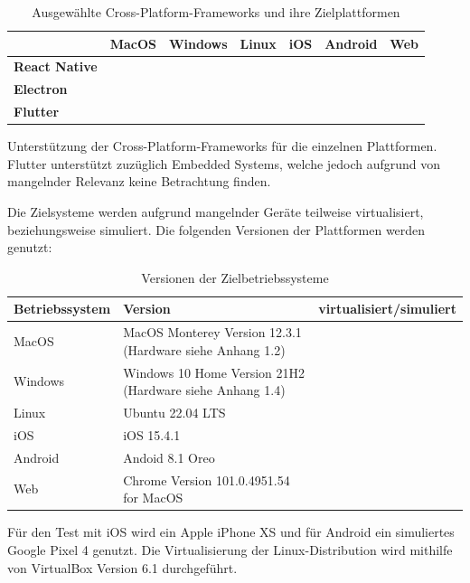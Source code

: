 \documentclass[a4paper]{scrartcl}
\newcommand{\xmark}{\ding{55}}
\begin{document}
\begin{table}[H]
 	\centering
 	\caption{Ausgewählte Cross-Platform-Frameworks und ihre Zielplattformen}
 	\begin{center}
 		\begin{tabular}{| l || c | c | c | c | c | c |}
 			\hline
 			\textbf{} & \textbf{MacOS} & \textbf{Windows} & \textbf{Linux} & \textbf{iOS} & \textbf{Android} & \textbf{Web} \\
 			\hline \hline
			\textbf{React Native} & \xmark & \xmark & \xmark & \Checkmark & \Checkmark & \xmark \\
 			\hline
 			\textbf{Electron} & \Checkmark & \Checkmark & \Checkmark & \xmark & \xmark & \xmark \\
 			\hline
 			\textbf{Flutter} & \Checkmark & \Checkmark & \Checkmark & \Checkmark & \Checkmark & \Checkmark \\
 			\hline
 		\end{tabular}
 	\end{center}
	Unterstützung der Cross-Platform-Frameworks für die einzelnen Plattformen. Flutter unterstützt zuzüglich Embedded Systems, welche jedoch aufgrund von mangelnder Relevanz keine Betrachtung finden.
 \end{table}
 
 Die Zielsysteme werden aufgrund mangelnder Geräte teilweise virtualisiert, beziehungsweise simuliert. Die folgenden Versionen der Plattformen werden genutzt:
 
\begin{table}[H]
 	\centering
 	\caption{Versionen der Zielbetriebssysteme}
 	\begin{center}
 		\begin{tabularx}{\linewidth}{| Y | Y | c |}
 			\hline
 			\textbf{Betriebssystem} & \textbf{Version} & \textbf{virtualisiert/simuliert} \\
 			\hline \hline
			MacOS & MacOS Monterey Version 12.3.1 (Hardware siehe Anhang 1.2) & \xmark \\
 			\hline
 			Windows & Windows 10 Home Version 21H2 (Hardware siehe Anhang 1.4) & \xmark \\
 			\hline
 			Linux & Ubuntu 22.04 LTS & \Checkmark \\
 			\hline
 			iOS & iOS 15.4.1 & \xmark \\
 			\hline
 			Android & Andoid 8.1 Oreo & \Checkmark \\
 			\hline
 			Web & Chrome Version 101.0.4951.54 for MacOS & \xmark \\
 			\hline
 		\end{tabularx}
 	\end{center}
	Für den Test mit iOS wird ein Apple iPhone XS und für Android ein simuliertes Google Pixel 4 genutzt. Die Virtualisierung der Linux-Distribution wird mithilfe von VirtualBox Version 6.1 durchgeführt.
\end{table}
 
\end{document}
